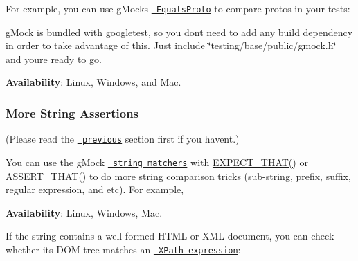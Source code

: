 For example, you can use g\+Mock\textquotesingle{}s \href{https://github.com/google/nucleus/blob/master/nucleus/testing/protocol-buffer-matchers.h}{\texttt{ Equals\+Proto}} to compare protos in your tests\+:


\begin{DoxyCode}{0}
\end{DoxyCode}


g\+Mock is bundled with googletest, so you don\textquotesingle{}t need to add any build dependency in order to take advantage of this. Just include {\ttfamily \char`\"{}testing/base/public/gmock.\+h\char`\"{}} and you\textquotesingle{}re ready to go.

{\bfseries{Availability}}\+: Linux, Windows, and Mac.

\subsubsection*{More String Assertions}

(Please read the \href{\#AssertThat}{\texttt{ previous}} section first if you haven\textquotesingle{}t.)

You can use the g\+Mock \href{../../googlemock/docs/CheatSheet.md\#string-matchers}{\texttt{ string matchers}} with {\ttfamily \mbox{\hyperlink{gmock-matchers_8h_ac31e206123aa702e1152bb2735b31409}{E\+X\+P\+E\+C\+T\+\_\+\+T\+H\+A\+T()}}} or {\ttfamily \mbox{\hyperlink{gmock-matchers_8h_a41d888579850c16583baea33ee8d057e}{A\+S\+S\+E\+R\+T\+\_\+\+T\+H\+A\+T()}}} to do more string comparison tricks (sub-\/string, prefix, suffix, regular expression, and etc). For example,


\begin{DoxyCode}{0}
\end{DoxyCode}


{\bfseries{Availability}}\+: Linux, Windows, Mac.

If the string contains a well-\/formed H\+T\+ML or X\+ML document, you can check whether its D\+OM tree matches an \href{http://www.w3.org/TR/xpath/\#contents}{\texttt{ X\+Path expression}}\+:


